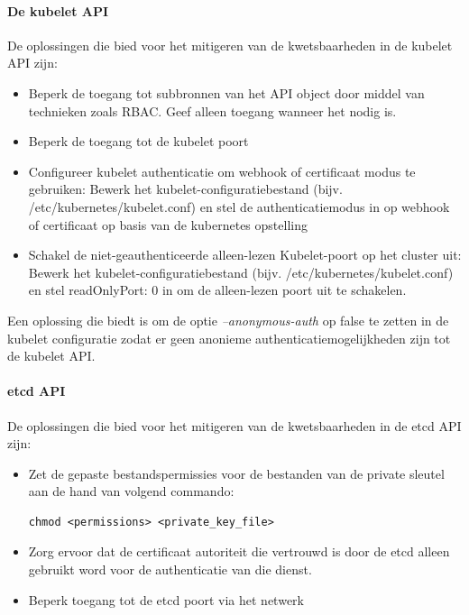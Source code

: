 \paragraph{De kubelet API}
De oplossingen die \textcite{KubernetesDocs-2023} bied voor het mitigeren van de kwetsbaarheden in de kubelet API zijn:
\begin{itemize}
    \item Beperk de toegang tot subbronnen van het API object door middel van technieken zoals RBAC. Geef alleen toegang wanneer het nodig is.
    \item Beperk de toegang tot de kubelet poort
    \item Configureer kubelet authenticatie om webhook of certificaat modus te gebruiken: Bewerk het kubelet-configuratiebestand (bijv. /etc/kubernetes/kubelet.conf) en stel de authenticatiemodus in op webhook of certificaat op basis van de kubernetes opstelling
    \item Schakel de niet-geauthenticeerde alleen-lezen Kubelet-poort op het cluster uit: Bewerk het kubelet-configuratiebestand (bijv. /etc/kubernetes/kubelet.conf) en stel readOnlyPort: 0 in om de alleen-lezen poort uit te schakelen.
\end{itemize}

Een oplossing die \textcite{OWASP-2023} biedt is om de optie \textit{--anonymous-auth} op false te zetten in de kubelet configuratie zodat er geen anonieme authenticatiemogelijkheden zijn tot de kubelet API.

\paragraph{etcd API}
De oplossingen die \textcite{KubernetesDocs-2023} bied voor het mitigeren van de kwetsbaarheden in de etcd API zijn:
\begin{itemize}
    \item Zet de gepaste bestandspermissies voor de bestanden van de private sleutel aan de hand van volgend commando:
\begin{lstlisting}[language=tex, caption={Opzetten gepaste bestandspermissies voor private sleutel}]
chmod <permissions> <private_key_file>
\end{lstlisting}
    \item Zorg ervoor dat de certificaat autoriteit die vertrouwd is door de etcd alleen gebruikt word voor de authenticatie van die dienst. 
    \item Beperk toegang tot de etcd poort via het netwerk
\end{itemize}


